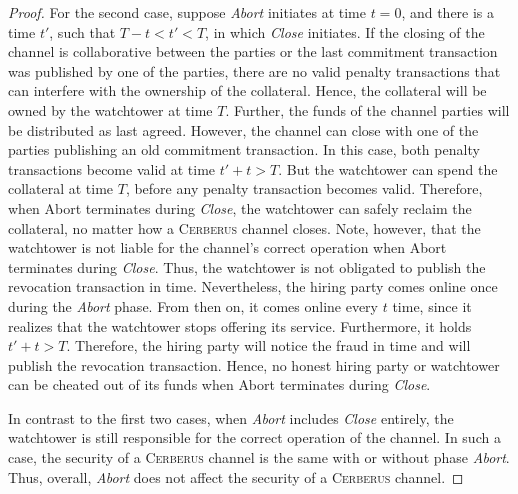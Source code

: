 \documentclass[twocolumn,showpacs,%
  nofootinbib,aps,superscriptaddress,%
  eqsecnum,prd,notitlepage,showkeys,10pt]{revtex4-1}
\newcommand{\sys}{\textsc{Cerberus}\xspace}
\begin{document}
\begin{proof}
For the second case, suppose \textit{Abort} initiates at time $t=0$, and there is a time $t'$, such that $T-t < t'< T$, in which \textit{Close} initiates.
If the closing of the channel is collaborative between the parties or the last commitment transaction was published by one of the parties, there are no valid penalty transactions that can interfere with the ownership of the collateral. Hence, the collateral will be owned by the watchtower at time $T$.
Further, the funds of the channel parties will be distributed as last agreed.
However, the channel can close with one of the parties publishing an old commitment transaction.
In this case, both penalty transactions become valid at time $t'+t>T$. But the watchtower can spend the collateral at time $T$, before any penalty transaction becomes valid.
Therefore, when {Abort} terminates during \textit{Close}, the watchtower can safely reclaim the collateral, no matter how a \sys channel closes.
Note, however, that the watchtower is not liable for the channel's correct operation when {Abort} terminates during \textit{Close}.
Thus, the watchtower is not obligated to publish the revocation transaction in time.
Nevertheless, the hiring party comes online once during the \textit{Abort} phase. From then on, it comes online every $t$ time, since it realizes that the watchtower stops offering its service. Furthermore, it holds $t'+t>T$.
Therefore, the hiring party will notice the fraud in time and will publish the revocation transaction.
Hence, no honest hiring party or watchtower can be cheated out of its funds when {Abort} terminates during \textit{Close}.


In contrast to the first two cases, when \textit{Abort} includes \textit{Close} entirely, the watchtower is still responsible for the correct operation of the channel.
In such a case, the security of a \sys channel is the same with or without phase \textit{Abort}.
Thus, overall, \textit{Abort} does not affect the security of a \sys channel.
\end{proof}
\end{document}

